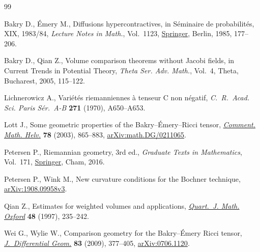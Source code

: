 \documentclass[pdftex]{sigma}
\numberwithin{equation}{section}
\begin{document}
\begin{thebibliography}{99}
\footnotesize\itemsep=0pt

Bakry D., \'{E}mery M., Diffusions hypercontractives, in S\'eminaire de
 probabilit\'es, {XIX}, 1983/84, \textit{Lecture Notes in Math.}, Vol.~1123,
 \href{https://doi.org/10.1007/BFb0075847}{Springer}, Berlin, 1985, 177--206.

Bakry D., Qian Z., Volume comparison theorems without {J}acobi fields, in
 Current Trends in Potential Theory, \textit{Theta Ser. Adv. Math.}, Vol.~4,
 Theta, Bucharest, 2005, 115--122.

Lichnerowicz A., Vari\'et\'es riemanniennes \`a tenseur {C} non n\'egatif,
 \textit{C.~R.~Acad. Sci. Paris S\'er.~A-B} \textbf{271} (1970), A650--A653.

Lott J., Some geometric properties of the {B}akry--\'{E}mery--{R}icci tensor,
 \href{https://doi.org/10.1007/s00014-003-0775-8}{\textit{Comment. Math. Helv.}} \textbf{78} (2003), 865--883, \href{https://arxiv.org/abs/math.DG/0211065}{arXiv:math.DG/0211065}.

Petersen P., Riemannian geometry, 3rd ed., \textit{Graduate Texts in Mathematics}, Vol.~171, \href{https://doi.org/10.1007/978-3-319-26654-1}{Springer}, Cham, 2016.

Petersen P., Wink M., New curvature conditions for the {B}ochner technique,
 \href{https://arxiv.org/abs/1908.09958v3}{arXiv:1908.09958v3}.

Qian Z., Estimates for weighted volumes and applications, \href{https://doi.org/10.1093/qmath/48.2.235}{\textit{Quart.~J.
 Math. Oxford}} \textbf{48} (1997), 235--242.

Wei G., Wylie W., Comparison geometry for the {B}akry--\'{E}mery {R}icci tensor,
 \href{https://doi.org/10.4310/jdg/1261495336}{\textit{J.~Differential Geom.}} \textbf{83} (2009), 377--405, \href{https://arxiv.org/abs/0706.1120}{arXiv:0706.1120}.

\end{thebibliography}\LastPageEnding
\end{document}
